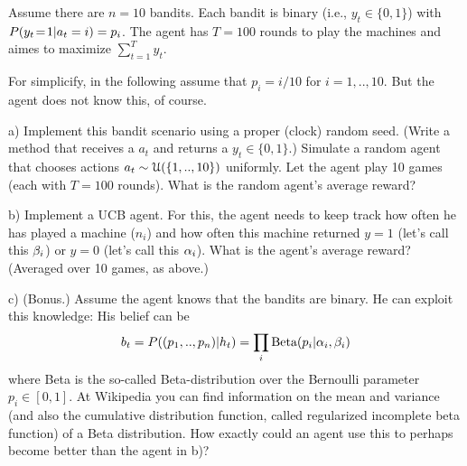 

\renewcommand{\course}{Optimization}
\renewcommand{\coursepicture}{optim}
\renewcommand{\coursedate}{Summer 2015}
\renewcommand{\exnum}{1}

\exercises
{}
\exercisestitle



Assume there are $n=10$ bandits. Each bandit is binary (i.e.,
$y_t\in\{0,1\}$) with $P(y_t\=1 | a_t=i) = p_i$. The agent has $T=100$
rounds to play the machines and aimes to maximize $\sum_{t=1}^T y_t$.

For simplicify, in the following assume that $p_i = i/10$ for
$i=1,..,10$. But the agent does not know this, of course.

a) Implement this bandit scenario using a proper (clock) random
seed. (Write a method that receives a $a_t$ and returns a
$y_t\in\{0,1\}$.) Simulate a random agent that chooses actions
$a_t \sim\UU(\{1,..,10\})$ uniformly. Let the agent play 10 games
(each with $T=100$ rounds). What is the random agent's average reward?

b) Implement a UCB agent. For this, the agent needs to keep track how
often he has played a machine ($n_i$) and how often this machine
returned $y=1$ (let's call this $\b_i$) or $y=0$ (let's call this
$\a_i$). What is the agent's average reward?  (Averaged over 10 games, as
above.)

c) (Bonus.) Assume the agent knows that the bandits are binary. He can
exploit this knowledge: His belief can be
$$b_t = P((p_1,..,p_n)|h_t) = \prod_i \text{Beta}(p_i|\a_i,\b_i)$$
where Beta is the so-called Beta-distribution over the Bernoulli
parameter $p_i\in[0,1]$. At Wikipedia you can find information on the
mean and variance (and also the cumulative distribution function, called
regularized incomplete beta function) of a Beta distribution. How
exactly could an agent use this to perhaps become better than the
agent in b)?

\exerfoot
